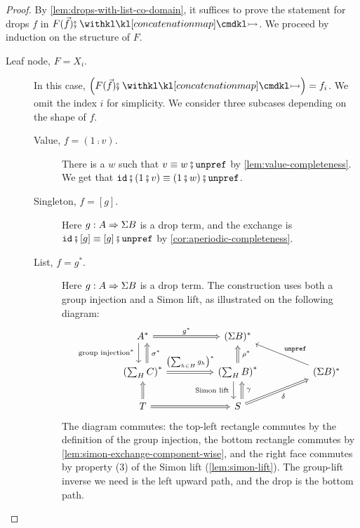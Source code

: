 \begin{proof}
    By \cref{lem:drops-with-list-co-domain}, it suffices to prove the statement for drops $f$ in  $F(\vec f) \comp \concmap$. We proceed by induction on the structure of $F$.
    \begin{description}
        \item[Leaf node, $F = X_i$.] In this case, $\left(F(\vec f) \comp \concmap\right) = f_i$. We omit the index $i$ for simplicity. We consider three subcases depending on the shape of $f$.
        \begin{description}
        \item[Value, $f = (1 \comp v)$.] There is a  $w$ such that $v \equiv w \comp \unprefterm$ by \cref{lem:value-completeness}. We get that $\idterm \comp (1 \comp v) \equiv (1 \comp w) \comp \unprefterm$.

        \item[Singleton, $f = {[g]}$.] Here $g : A \Rightarrow \Sigma B$ is a drop term, and the exchange is $\idterm \comp [g] \equiv [g] \comp \unprefterm$ by \cref{cor:aperiodic-completeness}.

        \item[List, $f = g^*$.] Here $g : A \Rightarrow \Sigma B$ is a drop term. The construction uses both a group injection and a Simon lift, as illustrated on the following diagram:
        \[
        \begin{tikzcd}[column sep=huge]
            A^*
            \ar[r, \dropar, "{g^*}"]
            \ar[d, shift right=1ex, "\text{group injection}^*"'{xshift=-0.5ex}]
            &(\Sigma B)^*
            \\ 
            \left(\sum_H C\right)^* 
            \ar[u, shift right=1ex, \dropar, "{\sigma^*}"'{xshift=0.5ex}]
            \ar[r, \dropar, "{\left(\sum_{h \in H} g_h\right)^*}"{yshift=0.5ex}]
            &\left(\sum_H B\right)^*
            \ar[u, \dropar, "\rho^*"'{xshift=0.5ex}]
            \ar[d, shift right=1ex, "\text{Simon lift}"'{xshift=-0.5ex}]
            &(\Sigma B)^*
            \ar[ul, "\unprefterm"']
            \\
            T 
            \ar[r, \dropar]
            \ar[u, \dropar]
            &S 
            \ar[u, shift right=1ex, \dropar, "\gamma"'{xshift=0.5ex}]
            \ar[ur, \dropar, "\delta"'{xshift=0.5ex}]
        \end{tikzcd}
        \]
        The diagram commutes: the top-left rectangle commutes by the definition of the group injection, the bottom rectangle commutes by \cref{lem:simon-exchange-component-wise}, and the right face commutes by property (3) of the Simon lift (\cref{lem:simon-lift}). The group-lift inverse we need is the left upward path, and the drop is the bottom path.
        \end{description}


\end{description}
\end{proof}
